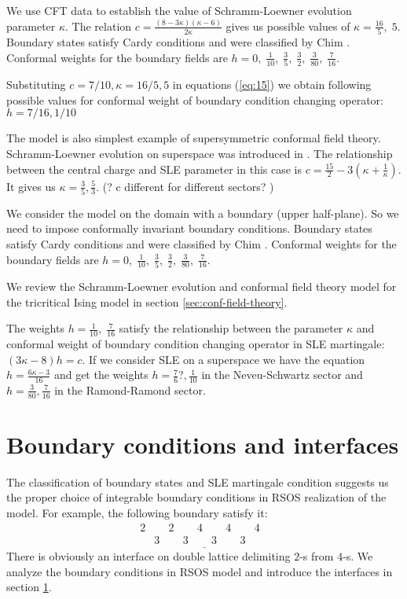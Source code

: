 \documentclass[12pt]{article}
\begin{document}
\begin{itemize}
We use CFT data to establish the value of Schramm-Loewner evolution parameter $\kappa$. The relation
$c=\frac{(8-3\kappa)(\kappa-6)}{2\kappa}$ gives us possible values of
$\kappa=\frac{16}{5},\; 5$. Boundary states satisfy Cardy conditions and were
classified by Chim \cite{chim1996boundary}. Conformal weights for the boundary fields are $h=0,\;
\frac{1}{10},\; \frac{3}{5},\; \frac{3}{2},\; \frac{3}{80},\;
\frac{7}{16}$.

Substituting $c=7/10, \kappa=16/5, 5$ in equations (\ref{eq:15}) we
obtain following possible values for conformal weight of boundary
condition changing operator: $h=7/16,1/10$


The model is also simplest example of supersymmetric conformal field theory. Schramm-Loewner
evolution on superspace was introduced in \cite{nagi2005stochastic,rasmussen2004stochastic}. The
relationship between the central charge and SLE parameter in this case is
$c=\frac{15}{2}-3\left(\kappa+\frac{1}{\kappa}\right)$. It gives us
$\kappa=\frac{3}{5},\frac{5}{3}$. (? c different for different sectors? )

We consider the model on the domain with a boundary (upper half-plane). So we need to impose
conformally invariant boundary conditions. Boundary states satisfy Cardy conditions and were
classified by Chim \cite{chim1996boundary}. Conformal weights for the boundary fields are $h=0,\;
\frac{1}{10},\; \frac{3}{5},\; \frac{3}{2},\; \frac{3}{80},\; \frac{7}{16}$.

We review the Schramm-Loewner evolution and conformal field theory model for the tricritical Ising
model in section \ref{sec:conf-field-theory}. 

The weights $h=\frac{1}{10},\; \frac{7}{16}$ satisfy the relationship between the parameter $\kappa$
and conformal weight of boundary condition changing operator in SLE martingale: $(3\kappa-8) h =c$.
If we consider SLE on a superspace we have the equation $h=\frac{6\kappa-3}{16}$ and get the weights
$h=\frac{7}{6}?, \frac{1}{10}$ in the Neveu-Schwartz sector and $h=\frac{3}{80}, \frac{7}{16}$ in
the Ramond-Ramond sector.

\section{Boundary conditions and interfaces}
\label{sec:bound-cond-interf}


The classification of boundary states and SLE martingale condition suggests us the proper choice of
integrable boundary conditions in RSOS realization of the model. For example, the following boundary
satisfy it:
\begin{equation}
  \label{eq:2}
  \underline{\begin{array}{llllllllll}
    2 & & 2 & & 4 & & 4 & & 4\\
    &  3 & & 3 & & 3 & & 3 & &
  \end{array}}
\end{equation}
There is obviously an interface on double lattice delimiting $2$-s from $4$-s. We analyze the
boundary conditions in RSOS model and  introduce the interfaces in section
\ref{sec:bound-cond-interf}. 


\end{itemize}
\end{document}
